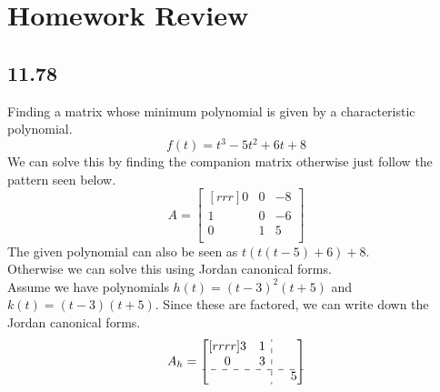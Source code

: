 \documentclass{report}
\newcommand*{\tempb}{\multicolumn{1}{:c}{}} %
\begin{document}
\section{Homework Review}
\subsection{11.78}
Finding a matrix whose minimum polynomial is given by a characteristic polynomial.
\[ f(t)=t^3-5t^2+6t+8 \]
We can solve this by finding the companion matrix otherwise just follow the pattern seen below.
\[ A=\begin{bmatrix}[rrr]0&0&-8\\1&0&-6\\0&1&5\\\end{bmatrix} \]
The given polynomial can also be seen as $t(t(t-5)+6)+8$.\\
Otherwise we can solve this using Jordan canonical forms.\\
Assume we have polynomials $h(t)=(t-3)^2(t+5)$ and $k(t)=(t-3)(t+5)$. Since these are factored, we can write down the Jordan canonical forms.
\[ A_h=\begin{bmatrix}[rrrr]3&1&\tempb&{}\\0&3&\tempb&{}\\\cdashline{1-4} {}&{}&\tempb&5\\\end{bmatrix} \]
\end{document}
